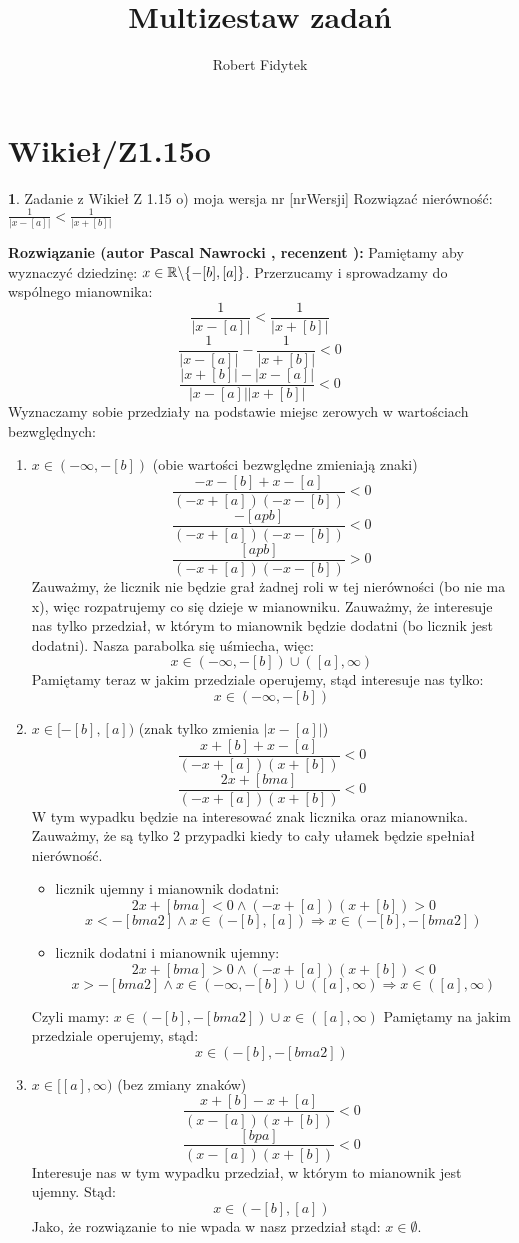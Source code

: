 \documentclass[12pt, a4paper]{article}
\title{Multizestaw zadań}
\author{Robert Fidytek}
\date{}
\theoremstyle{definition} %
\newtheorem{zad}{}
\newcommand{\kategoria}[1]{\section{#1}} %
\newcommand{\zadStart}[1]{\begin{zad}#1\newline} %
\newcommand{\zadStop}{\end{zad}}   %
\newcommand{\rozwStart}[2]{\noindent \textbf{Rozwiązanie (autor #1 , recenzent #2): }\newline} %
\begin{document}
\maketitle


\kategoria{Wikieł/Z1.15o}
\zadStart{Zadanie z Wikieł Z 1.15 o) moja wersja nr [nrWersji]}
Rozwiązać nierówność: $\frac{1}{|x-[a]|}<\frac{1}{|x+[b]|}$
\zadStop
\rozwStart{Pascal Nawrocki}{}
Pamiętamy aby wyznaczyć dziedzinę: $x\in\mathbb{R}\symbol{92}\{-[b],[a]\}$.
Przerzucamy i sprowadzamy do wspólnego mianownika:
$$\frac{1}{|x-[a]|}<\frac{1}{|x+[b]|}$$
\newline
$$\frac{1}{|x-[a]|}-\frac{1}{|x+[b]|}<0$$
\newline
$$\frac{|x+[b]|-|x-[a]|}{|x-[a]||x+[b]|}<0$$
Wyznaczamy sobie przedziały na podstawie miejsc zerowych w wartościach bezwględnych:
\begin{enumerate}
\item $x\in(-\infty,-[b])$ (obie wartości bezwględne zmieniają znaki)
$$\frac{-x-[b]+x-[a]}{(-x+[a])(-x-[b])}<0$$
$$\frac{-[apb]}{(-x+[a])(-x-[b])}<0$$
$$\frac{[apb]}{(-x+[a])(-x-[b])}>0$$
Zauważmy, że licznik nie będzie grał żadnej roli w tej nierówności (bo nie ma x), więc rozpatrujemy co się dzieje w mianowniku. Zauważmy, że interesuje nas tylko przedział, w którym to mianownik będzie dodatni (bo licznik jest dodatni). Nasza parabolka się uśmiecha, więc:
$$x\in(-\infty,-[b])\cup([a],\infty)$$
Pamiętamy teraz w jakim przedziale operujemy, stąd interesuje nas tylko:
$$x\in(-\infty,-[b])$$
\item $x\in[-[b],[a])$ (znak tylko zmienia $|x-[a]|$)
$$\frac{x+[b]+x-[a]}{(-x+[a])(x+[b])}<0$$
$$\frac{2x+[bma]}{(-x+[a])(x+[b])}<0$$
W tym wypadku będzie na interesować znak licznika oraz mianownika. Zauważmy, że są tylko 2 przypadki kiedy to cały ułamek będzie spełniał nierówność.
\begin{itemize}
\item licznik ujemny i mianownik dodatni:
$$2x+[bma]<0 \wedge (-x+[a])(x+[b])>0$$
$$x<-[bma2] \wedge x\in(-[b],[a])\Rightarrow x\in(-[b],-[bma2])$$
\item licznik dodatni i mianownik ujemny:
$$2x+[bma]>0 \wedge (-x+[a])(x+[b])<0$$
$$x>-[bma2] \wedge x\in(-\infty,-[b])\cup([a],\infty)\Rightarrow x\in([a],\infty)$$
\end{itemize}
Czyli mamy: $x\in(-[b],-[bma2])\cup x\in([a],\infty)$
Pamiętamy na jakim przedziale operujemy, stąd:
$$x\in(-[b],-[bma2])$$
\item $x\in[[a],\infty)$ (bez zmiany znaków)
$$\frac{x+[b]-x+[a]}{(x-[a])(x+[b])}<0$$
$$\frac{[bpa]}{(x-[a])(x+[b])}<0$$
Interesuje nas w tym wypadku przedział, w którym to mianownik jest ujemny. Stąd:
$$x\in(-[b],[a])$$
Jako, że rozwiązanie to nie wpada w nasz przedział stąd: $x\in\emptyset$.
\end{enumerate}
\end{document}

